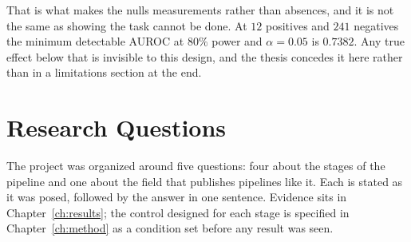 That is what makes the nulls measurements rather than absences, and it is not
the same as showing the task cannot be done. At $12$ positives and $241$
negatives the minimum detectable AUROC at $80\%$ power and $\alpha = 0.05$ is
$0.7382$. Any true effect below that is invisible to this design, and the thesis
concedes it here rather than in a limitations section at the end.

\section{Research Questions}
\label{sec:intro-rqs}

The project was organized around five questions: four about the stages of the
pipeline and one about the field that publishes pipelines like it. Each is
stated as it was posed, followed by the answer in one sentence. Evidence sits in
Chapter~\ref{ch:results}; the control designed for each stage is specified in
Chapter~\ref{ch:method} as a condition set before any result was seen.

